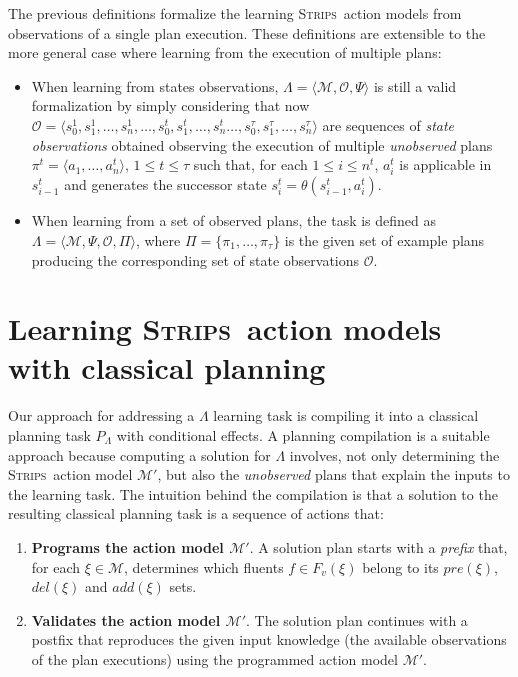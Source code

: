 \documentclass[3p,times]{elsarticle}
\newcommand{\strips}{\textsc{Strips}}     %
\newcommand{\tup}[1]{{\langle #1 \rangle}}
\begin{document}
The previous definitions formalize the learning \strips\ action models from observations of a single plan execution. These definitions are extensible to the more general case where learning from the execution of multiple plans:
\begin{itemize}
  \item When learning from states observations, $\Lambda=\tup{\mathcal{M},\mathcal{O},\Psi}$ is still a valid formalization by simply considering that now $\mathcal{O}=\tup{s_0^1,s_1^1,\ldots,s_{n}^1,\ldots,s_0^t,s_1^t,\ldots,s_{n}^t\ldots,s_0^{\tau},s_1^{\tau},\ldots,s_{n}^{\tau}}$ are sequences of {\em state observations} obtained observing the execution of multiple {\em unobserved} plans $\pi^t=\tup{a_1, \ldots, a_n^t}$, {\tt\small $1\leq t\leq \tau$} such that, for each {\small $1\leq i\leq n^t$}, $a_i^t$ is applicable in $s_{i-1}^t$ and generates the successor state $s_i^t=\theta(s_{i-1}^t,a_i^t)$.
  \item When learning from a set of observed plans, the task is defined as $\Lambda=\tup{\mathcal{M},\Psi,\mathcal{O},\Pi}$, where $\Pi=\{\pi_1,\ldots,\pi_{\tau}\}$ is the given set of example plans producing the corresponding set of state observations $\mathcal{O}$.
\end{itemize}  



\section{Learning \strips\ action models with classical planning}
\label{sec:Section5}
Our approach for addressing a $\Lambda$ learning task is compiling it into a classical planning task $P_{\Lambda}$ with conditional effects. A planning compilation is a suitable approach because computing a solution for $\Lambda$ involves, not only determining the \strips\ action model $\mathcal{M}'$, but also the {\em unobserved} plans that explain the inputs to the learning task. The intuition behind the compilation is that a solution to the resulting classical planning task is a sequence of actions that:

\begin{enumerate}
\item {\bf Programs the action model $\mathcal{M}'$}. A solution plan starts with a {\em prefix} that, for each $\xi\in\mathcal{M}$, determines which fluents $f\in F_v(\xi)$ belong to its $pre(\xi)$, $del(\xi)$ and $add(\xi)$ sets.
\item {\bf Validates the action model $\mathcal{M}'$}. The solution plan continues with a postfix that reproduces the given input knowledge (the available observations of the plan executions) using the programmed action model $\mathcal{M}'$.
\end{enumerate}
\end{document}
